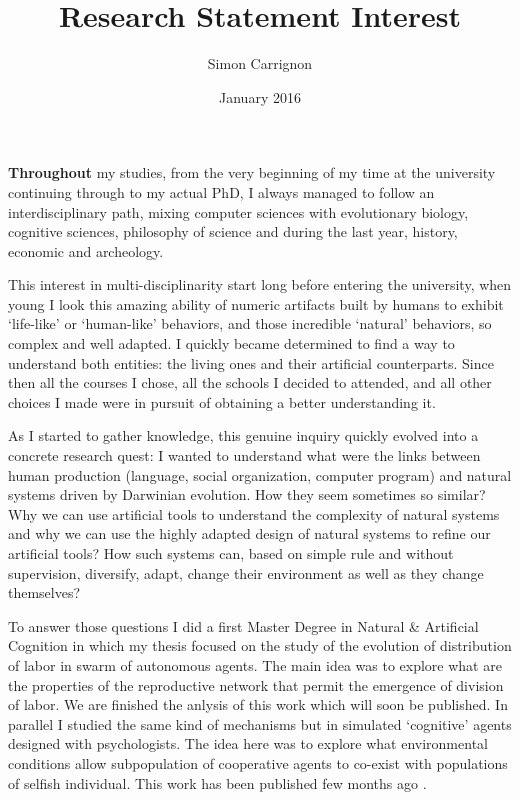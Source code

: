 \documentclass[10pt]{article}
\author{Simon Carrignon}
\title{Research Statement Interest}
\date{January 2016}
\begin{document}
\maketitle


\textbf{Throughout} my studies, from the very beginning of my time at the university continuing through to my actual PhD, I always managed to follow an interdisciplinary path, mixing computer sciences with evolutionary biology, cognitive sciences, philosophy of science and during the last year, history, economic and archeology.

This interest in multi-disciplinarity start long before entering the university, when young I look this amazing ability of numeric artifacts built by humans to exhibit ‘life-like’ or ‘human-like’ behaviors, and those incredible ‘natural' behaviors, so complex and well adapted. I quickly became determined to find a way to understand both entities: the living ones and their artificial counterparts. Since then all the courses I chose, all the schools I decided to attended, and all other choices I made were in pursuit of obtaining a better understanding it.

As I started to gather knowledge, this genuine inquiry quickly evolved into a concrete research quest: I wanted to understand what were the links between human production (language, social organization, computer program) and natural systems driven by Darwinian evolution. How they seem sometimes so similar? Why we can use artificial tools to understand the complexity of natural systems and why we can use the highly adapted design of natural systems to refine our artificial tools? How such systems can, based on simple rule and without supervision, diversify, adapt, change their environment as well as they change themselves? 

To answer those questions I did a first Master Degree in Natural \& Artificial Cognition in which my thesis focused on the study of the evolution of distribution of labor in swarm of autonomous agents. The main idea was to explore what are the properties of the reproductive network that permit the emergence of division of labor. We are finished the anlysis of this work which will soon be published. In parallel I studied the same kind of mechanisms but in simulated ‘cognitive’ agents designed with psychologists. The idea here was to explore what environmental conditions allow subpopulation of cooperative agents to co-exist with populations of selfish individual. This work has been published few months ago \cite{zibetti2015acaciaesanagentbasedmodelingandsimulationtoolforinvestigatingsocialbehaviorsinresourcelimitedtwodimensionalenvironments}.
\end{document}
